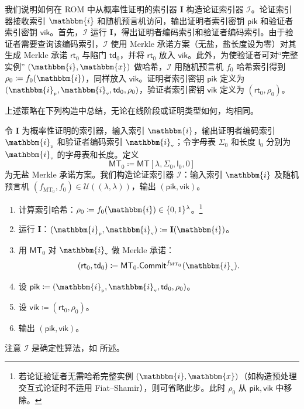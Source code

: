 \documentclass[american,singlepageview]{snargs-book-zh}
\newcommand{\Bits}{\{0,1\}}
\newcommand{\DefineEqual}{\coloneqq}
\newcommand{\Index}{\mathbbm{i}}
\newcommand{\Instance}{\mathbbm{x}}
\newcommand{\ProtoIndexer}{I}
\newcommand{\ProtoAlphabet}{\Sigma}
\newcommand{\ProtoProofLength}{\mathsf{l}}
\newcommand{\PPIndexer}{\mathbf{\ProtoIndexer}}
\newcommand{\IOPVerifierRandomMessage}{\rho}
\newcommand{\ProverEncodedIndex}{\Index_{{\scriptscriptstyle\mathrm{p}}}}
\newcommand{\VerifierEncodedIndex}{\Index_{{\scriptscriptstyle\mathrm{v}}}}
\newcommand{\ARGFormat}[1]{\mathcal{#1}}
\newcommand{\ARGIndexer}{\ARGFormat{\ProtoIndexer}}
\newcommand{\ARGpik}{\mathsf{pik}}
\newcommand{\ARGvik}{\mathsf{vik}}
\newcommand{\IndexRoundSubscript}{0}
\newcommand{\ROFunction}{f}
\newcommand{\RODistribution}[1]{\mathcal{U}(#1)}
\newcommand{\SecurityParameter}{\lambda}
\newcommand{\ROTreeSymbol}{\MTSubscript}
\newcommand{\MTSymbol}{\mathsf{MT}}
\newcommand{\MTSubscript}{{\scriptscriptstyle\mathrm{MT}}}
\newcommand{\MTConstructor}[4]{\MTSymbol[#1,#2,#3,#4]}
\newcommand{\MTCommitment}{\mathsf{rt}}
\newcommand{\MTTrapdoor}{\mathsf{td}}
\newcommand{\MTIdxCommit}[1]{\MTSymbol_{#1}.\mathsf{Commit}}
\newcommand{\HashedIndex}{\IOPVerifierRandomMessage_{\IndexRoundSubscript}}
\newcommand{\ROIndexHashFunction}{\ROFunction_{\IndexRoundSubscript}}
\newcommand{\ROIndexTreeFunction}{\ROFunction_{\ROTreeSymbol_{\IndexRoundSubscript}}}
\begin{document}
我们说明如何在 ROM 中从概率性证明的索引器 $\PPIndexer$ 构造论证索引器 $\ARGIndexer$。论证索引器接收索引 $\Index$ 和随机预言机访问，输出证明者索引密钥 $\ARGpik$ 和验证者索引密钥 $\ARGvik$。首先，$\ARGIndexer$ 运行 $\PPIndexer$，得出证明者编码索引和验证者编码索引。由于验证者需要查询该编码索引，$\ARGIndexer$ 使用 Merkle 承诺方案（无盐，盐长度设为零）对其生成 Merkle 承诺 $\MTCommitment_{\IndexRoundSubscript}$ 与陷门 $\MTTrapdoor_{\IndexRoundSubscript}$，并将 $\MTCommitment_{\IndexRoundSubscript}$ 放入 $\ARGvik$。此外，为使验证者可对“完整实例” $(\Index,\Instance)$ 做哈希，$\ARGIndexer$ 用随机预言机 $\ROIndexHashFunction$ 哈希索引得到 $\HashedIndex\DefineEqual\ROIndexHashFunction(\Index)$，同样放入 $\ARGvik$。证明者索引密钥 $\ARGpik$ 定义为 $(\ProverEncodedIndex,\VerifierEncodedIndex,\MTTrapdoor_{\IndexRoundSubscript},\HashedIndex)$，验证者索引密钥 $\ARGvik$ 定义为 $(\MTCommitment_{\IndexRoundSubscript},\HashedIndex)$。

上述策略在下列构造中总结，无论在线阶段或证明类型如何，均相同。

\begin{construction}
\label{construction:argument-indexer}
令 $\PPIndexer$ 为概率性证明的索引器，输入索引 $\Index$，输出证明者编码索引 $\ProverEncodedIndex$ 和验证者编码索引 $\VerifierEncodedIndex$；令字母表 $\ProtoAlphabet_{\IndexRoundSubscript}$ 和长度 $\ProtoProofLength_{\IndexRoundSubscript}$ 分别为 $\VerifierEncodedIndex$ 的字母表和长度。定义
\[
  \MTSymbol_{\IndexRoundSubscript}
    \DefineEqual \MTConstructor{\SecurityParameter}
      {\ProtoAlphabet_{\IndexRoundSubscript}}
      {\ProtoProofLength_{\IndexRoundSubscript}}{0}
\]
为无盐 Merkle 承诺方案。我们构造论证索引器 $\ARGIndexer$：输入索引 $\Index$ 及随机预言机 $(\ROIndexTreeFunction,\ROIndexHashFunction)\in\RODistribution{(\SecurityParameter,\SecurityParameter)}$，输出 $(\ARGpik,\ARGvik)$。
\begin{enumerate}[nolistsep]
  \item 计算索引哈希：$\HashedIndex\DefineEqual\ROIndexHashFunction(\Index)\in\Bits^{\SecurityParameter}$。\footnote{若论证验证者无需哈希完整实例 $(\Index,\Instance)$（如构造预处理交互式论证时不适用 Fiat–Shamir），则可省略此步。此时 $\HashedIndex$ 从 $\ARGpik,\ARGvik$ 中移除。}
  \item 运行 $\PPIndexer$：$(\ProverEncodedIndex,\VerifierEncodedIndex)
    \DefineEqual \PPIndexer(\Index)$。
  \item 用 $\MTSymbol_{\IndexRoundSubscript}$ 对 $\VerifierEncodedIndex$ 做 Merkle 承诺：
  \[
    (\MTCommitment_{\IndexRoundSubscript},
      \MTTrapdoor_{\IndexRoundSubscript})
      \DefineEqual \MTIdxCommit{\IndexRoundSubscript}^{\ROIndexTreeFunction}
        (\VerifierEncodedIndex).
  \]
  \item 设 $\ARGpik\DefineEqual(\ProverEncodedIndex,\VerifierEncodedIndex,
    \MTTrapdoor_{\IndexRoundSubscript},\HashedIndex)$。
  \item 设 $\ARGvik\DefineEqual(\MTCommitment_{\IndexRoundSubscript},\HashedIndex)$。
  \item 输出 $(\ARGpik,\ARGvik)$。
\end{enumerate}
注意 $\ARGIndexer$ 是确定性算法，如  所述。
\end{construction}
\end{document}
